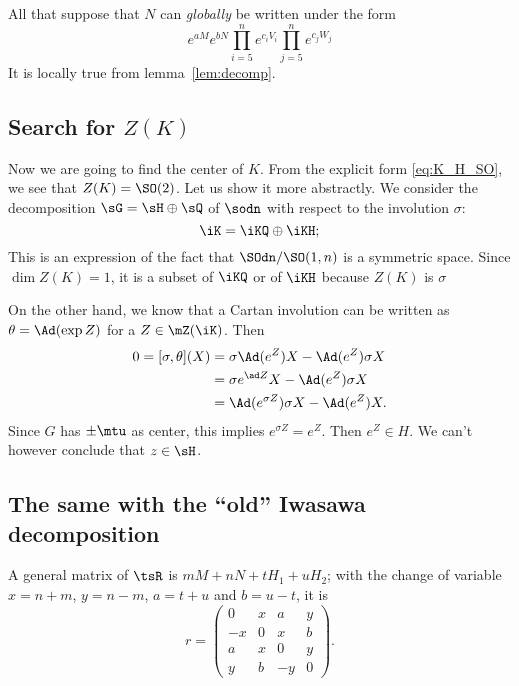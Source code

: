All that suppose that $N$ can \emph{globally} be written under the form
\[
  e^{aM}e^{bN}\prod_{i=5}^{n}e^{c_iV_i}\prod_{j=5}^{n}e^{c_jW_j}
\]
It is locally true from lemma~\ref{lem:decomp}.


\subsection{Search for \texorpdfstring{$Z(K)$}{ZK}}

Now we are going to find the center of $K$. From the explicit form \eqref{eq:K_H_SO}, we see that $Z(K)=\SO(2)$. Let us show it more abstractly. We consider the decomposition $\sG=\sH\oplus\sQ$ of $\sodn$ with respect to the involution $\sigma$:
\[
   \iK=\iKQ\oplus\iKH;
\]
This is an expression of the fact that $\SOdn/\SO(1,n)$ is a symmetric space. Since $\dim Z(K)=1$, it is a subset of $\iKQ$ or of $\iKH$ because $Z(K)$ is $\sigma$

On the other hand, we know that a Cartan involution can be written as $\theta=\Ad(\exp Z)$ for a $Z\in \mZ(\iK)$. Then
\begin{equation}
\begin{split}
  0=[\sigma,\theta](X)&=\sigma\Ad(e^Z)X-\Ad(e^Z)\sigma X\\
                      &=\sigma e^{\ad Z}X-\Ad(e^Z)\sigma X\\
		      &=\Ad(e^{\sigma Z})\sigma X-\Ad(e^Z)X.
\end{split}
\end{equation}
Since $G$ has $\pm\mtu$ as center, this implies $e^{\sigma Z}=e^Z$. Then $e^Z\in H$. We can't however conclude that $z\in\sH$.

\subsection{The same with the ``old'' Iwasawa decomposition}

A general matrix of $\tsR$ is $mM+nN+tH_1+uH_2$; with the change of variable $x=n+m$, $y=n-m$, $a=t+u$ and $b=u-t$, it is
\begin{equation}
r=
\begin{pmatrix}
  0  & x & a  & y\\
  -x & 0 & x  & b\\
  a  & x & 0  & y\\
  y  & b & -y & 0
 \end{pmatrix}.
\end{equation}

